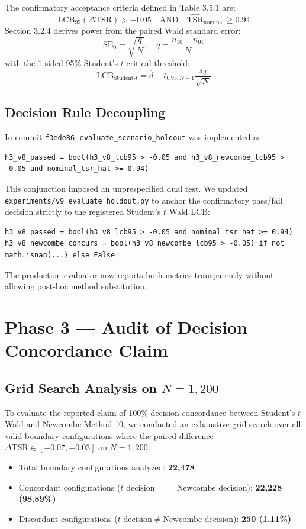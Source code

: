 \documentclass[10pt,a4paper]{article}
\begin{document}
The confirmatory acceptance criteria defined in Table 3.5.1 are:
\begin{equation}
\mathrm{LCB}_{95}(\Delta\mathrm{TSR}) > -0.05 \quad \text{AND} \quad \widehat{\mathrm{TSR}}_{\mathrm{nominal}} \ge 0.94
\end{equation}
Section 3.2.4 derives power from the paired Wald standard error:
\begin{equation}
\mathrm{SE}_0 = \sqrt{\frac{q}{N}}, \quad q = \frac{n_{10} + n_{01}}{N}
\end{equation}
with the 1-sided 95\% Student's $t$ critical threshold:
\begin{equation}
\mathrm{LCB}_{\text{Student-}t} = \overline{d} - t_{0.95, N-1} \frac{s_d}{\sqrt{N}}
\end{equation}

\subsection{Decision Rule Decoupling}
In commit \texttt{f3ede86}, \texttt{evaluate\_scenario\_holdout} was implemented as:
\begin{verbatim}
h3_v8_passed = bool(h3_v8_lcb95 > -0.05 and h3_v8_newcombe_lcb95 > -0.05 and nominal_tsr_hat >= 0.94)
\end{verbatim}
This conjunction imposed an unprespecified dual test. We updated \texttt{experiments/v9\_evaluate\_holdout.py} to anchor the confirmatory pass/fail decision strictly to the registered Student's $t$ Wald LCB:
\begin{verbatim}
h3_v8_passed = bool(h3_v8_lcb95 > -0.05 and nominal_tsr_hat >= 0.94)
h3_v8_newcombe_concurs = bool(h3_v8_newcombe_lcb95 > -0.05) if not math.isnan(...) else False
\end{verbatim}
The production evaluator now reports both metrics transparently without allowing post-hoc method substitution.

\section{Phase 3 --- Audit of Decision Concordance Claim}

\subsection{Grid Search Analysis on $N = 1,200$}
To evaluate the reported claim of 100\% decision concordance between Student's $t$ Wald and Newcombe Method 10, we conducted an exhaustive grid search over all valid boundary configurations where the paired difference $\Delta\mathrm{TSR} \in [-0.07, -0.03]$ on $N = 1,200$:
\begin{itemize}
    \item Total boundary configurations analyzed: \textbf{22,478}
    \item Concordant configurations ($t\text{ decision} == \text{Newcombe decision}$): \textbf{22,228 (98.89\%)}
    \item Discordant configurations ($t\text{ decision} \ne \text{Newcombe decision}$): \textbf{250 (1.11\%)}
\end{itemize}
\end{document}
